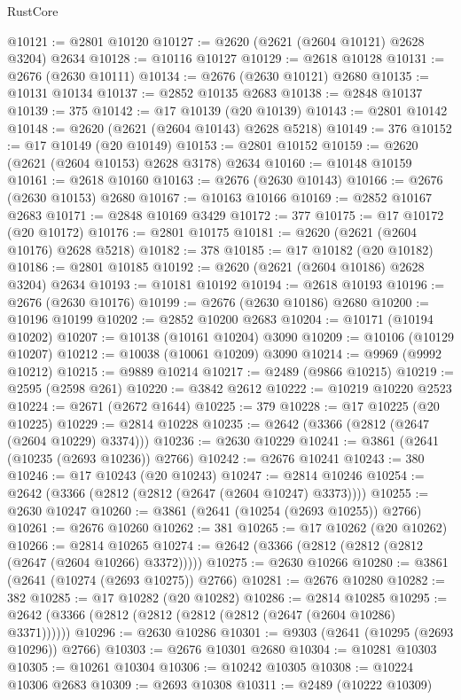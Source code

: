 \begin{lexlean}{RustCore}
\begin{coremodule}
@10121 := @2801 @10120
@10127 := @2620 (@2621 (@2604 @10121) @2628 @3204) @2634
@10128 := @10116 @10127
@10129 := @2618 @10128
@10131 := @2676 (@2630 @10111)
@10134 := @2676 (@2630 @10121) @2680
@10135 := @10131 @10134
@10137 := @2852 @10135 @2683
@10138 := @2848 @10137
@10139 := 375
@10142 := @17 @10139 (@20 @10139)
@10143 := @2801 @10142
@10148 := @2620 (@2621 (@2604 @10143) @2628 @5218)
@10149 := 376
@10152 := @17 @10149 (@20 @10149)
@10153 := @2801 @10152
@10159 := @2620 (@2621 (@2604 @10153) @2628 @3178) @2634
@10160 := @10148 @10159
@10161 := @2618 @10160
@10163 := @2676 (@2630 @10143)
@10166 := @2676 (@2630 @10153) @2680
@10167 := @10163 @10166
@10169 := @2852 @10167 @2683
@10171 := @2848 @10169 @3429
@10172 := 377
@10175 := @17 @10172 (@20 @10172)
@10176 := @2801 @10175
@10181 := @2620 (@2621 (@2604 @10176) @2628 @5218)
@10182 := 378
@10185 := @17 @10182 (@20 @10182)
@10186 := @2801 @10185
@10192 := @2620 (@2621 (@2604 @10186) @2628 @3204) @2634
@10193 := @10181 @10192
@10194 := @2618 @10193
@10196 := @2676 (@2630 @10176)
@10199 := @2676 (@2630 @10186) @2680
@10200 := @10196 @10199
@10202 := @2852 @10200 @2683
@10204 := @10171 (@10194 @10202)
@10207 := @10138 (@10161 @10204) @3090
@10209 := @10106 (@10129 @10207)
@10212 := @10038 (@10061 @10209) @3090
@10214 := @9969 (@9992 @10212)
@10215 := @9889 @10214
@10217 := @2489 (@9866 @10215)
@10219 := @2595 (@2598 @261)
@10220 := @3842 @2612
@10222 := @10219 @10220 @2523
@10224 := @2671 (@2672 @1644)
@10225 := 379
@10228 := @17 @10225 (@20 @10225)
@10229 := @2814 @10228
@10235 := @2642 (@3366 (@2812 (@2647 (@2604 @10229) @3374)))
@10236 := @2630 @10229
@10241 := @3861 (@2641 (@10235 (@2693 @10236)) @2766)
@10242 := @2676 @10241
@10243 := 380
@10246 := @17 @10243 (@20 @10243)
@10247 := @2814 @10246
@10254 := @2642 (@3366 (@2812 (@2812 (@2647 (@2604 @10247) @3373))))
@10255 := @2630 @10247
@10260 := @3861 (@2641 (@10254 (@2693 @10255)) @2766)
@10261 := @2676 @10260
@10262 := 381
@10265 := @17 @10262 (@20 @10262)
@10266 := @2814 @10265
@10274 := @2642 (@3366 (@2812 (@2812 (@2812 (@2647 (@2604 @10266) @3372)))))
@10275 := @2630 @10266
@10280 := @3861 (@2641 (@10274 (@2693 @10275)) @2766)
@10281 := @2676 @10280
@10282 := 382
@10285 := @17 @10282 (@20 @10282)
@10286 := @2814 @10285
@10295 := @2642 (@3366 (@2812 (@2812 (@2812 (@2812 (@2647 (@2604 @10286) @3371))))))
@10296 := @2630 @10286
@10301 := @9303 (@2641 (@10295 (@2693 @10296)) @2766)
@10303 := @2676 @10301 @2680
@10304 := @10281 @10303
@10305 := @10261 @10304
@10306 := @10242 @10305
@10308 := @10224 @10306 @2683
@10309 := @2693 @10308
@10311 := @2489 (@10222 @10309)

\end{coremodule}
\end{lexlean}
